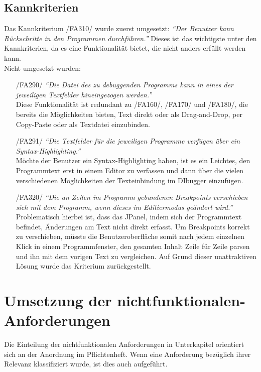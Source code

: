 \documentclass[parskip=full]{scrartcl}
\begin{document}
\subsection{Kannkriterien}
Das Kannkriterium /FA310/ wurde zuerst umgesetzt: \textit{\enquote{Der Benutzer kann Rückschritte in den Programmen durchführen.}} Dieses ist das wichtigste unter den Kannkriterien, da es eine Funktionalität bietet, die nicht anders erfüllt werden kann. \\
Nicht umgesetzt wurden:
\begin{itemize}
\item[/FA290/] \textit{\enquote{Die Datei des zu debuggenden Programms kann in eines der jeweiligen Textfelder hineingezogen werden.}} \\
Diese Funktionalität ist redundant zu /FA160/, /FA170/ und /FA180/, die bereits die Möglichkeiten bieten, Text direkt oder als Drag-and-Drop, per Copy-Paste oder als Textdatei einzubinden.
\item[/FA291/] \textit{\enquote{Die Textfelder für die jeweiligen Programme verfügen über ein Syntax-Highlighting.}} \\
Möchte der Benutzer ein Syntax-Highlighting haben, ist es ein Leichtes, den Programmtext erst in einem Editor zu verfassen und dann über die vielen verschiedenen Möglichkeiten der Texteinbindung im DIbugger einzufügen.
\item[/FA320/] \textit{\enquote{Die an Zeilen im Programm gebundenen Breakpoints verschieben sich mit dem Programm, wenn dieses im Editiermodus geändert wird.}}  \\
Problematisch hierbei ist, dass das JPanel, indem sich der Programmtext befindet, Änderungen am Text nicht direkt erfasst. Um Breakpoints korrekt zu verschieben, müsste die Benutzeroberfläche somit nach jedem einzelnen Klick in einem Programmfenster, den gesamten Inhalt Zeile für Zeile parsen und ihn mit dem vorigen Text zu vergleichen. Auf Grund dieser unattraktiven Lösung wurde das Kriterium zurückgestellt.

\end{itemize}


\section{Umsetzung der nichtfunktionalen-Anforderungen}

Die Einteilung der nichtfunktionalen Anforderungen in Unterkapitel orientiert sich an der Anordnung im Pflichtenheft. Wenn eine Anforderung bezüglich ihrer Relevanz klassifiziert wurde, ist dies auch aufgeführt.			
			 
\end{document}
